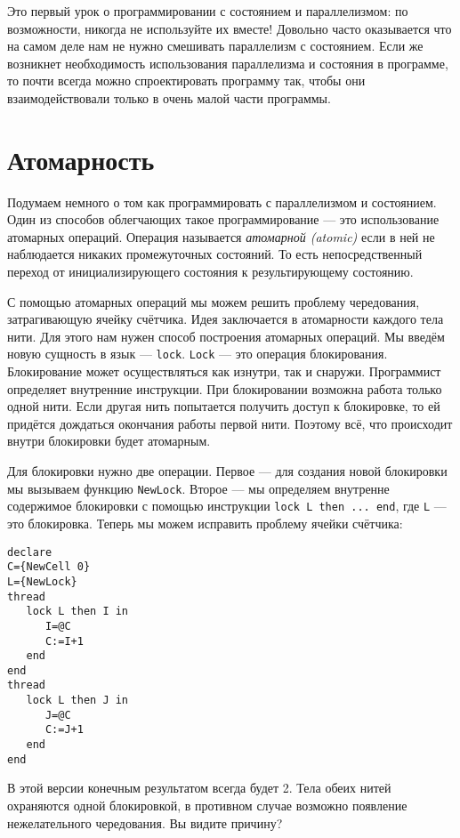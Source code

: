Это первый урок о программировании с состоянием и параллелизмом: по возможности, никогда не используйте их вместе! Довольно часто оказывается что на самом деле нам не нужно смешивать параллелизм с состоянием. Если же возникнет необходимость использования параллелизма и состояния в программе, то почти всегда можно спроектировать программу так, чтобы они взаимодействовали только в очень малой части программы.

\section{Атомарность}\label{section:atomicity}

Подумаем немного о том как программировать с параллелизмом и состоянием. Один из способов облегчающих такое программирование --- это использование атомарных операций. Операция называется \emph{атомарной (atomic)} если в ней не наблюдается никаких промежуточных состояний. То есть непосредственный переход от инициализирующего состояния к результирующему состоянию.

С помощью атомарных операций мы можем решить проблему чередования, затрагивающую ячейку счётчика. Идея заключается в атомарности каждого тела нити. Для этого нам нужен способ построения атомарных операций. Мы введём новую сущность в язык --- \lstinline|lock|. \lstinline|Lock| --- это операция блокирования. Блокирование может осуществляться как изнутри, так и снаружи. Программист определяет внутренние инструкции. При блокировании возможна работа только одной нити. Если другая нить попытается получить доступ к блокировке, то ей придётся дождаться окончания работы первой нити. Поэтому всё, что происходит внутри блокировки будет атомарным.

Для блокировки нужно две операции. Первое --- для создания новой блокировки мы вызываем функцию \lstinline|NewLock|. Второе --- мы определяем внутренне содержимое блокировки с помощью инструкции \lstinline{lock L then ... end}, где \lstinline|L| --- это блокировка. Теперь мы можем исправить проблему ячейки счётчика:

\begin{lstlisting}
declare
C={NewCell 0}
L={NewLock}
thread
   lock L then I in
      I=@C
      C:=I+1
   end
end
thread
   lock L then J in
      J=@C
      C:=J+1
   end
end
\end{lstlisting}

В этой версии конечным результатом всегда будет 2. Тела обеих нитей охраняются одной блокировкой, в противном случае возможно появление нежелательного чередования. Вы видите причину?

